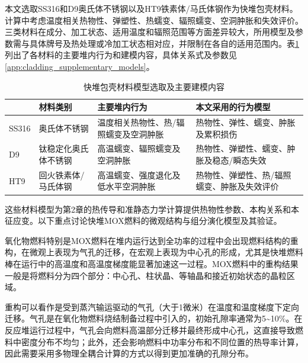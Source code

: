 本文选取SS316和D9奥氏体不锈钢以及HT9铁素体/马氏体钢作为快堆包壳材料。计算中考虑温度相关热物性、弹塑性、热蠕变、辐照蠕变、空洞肿胀和失效评价。三类材料在成分、加工状态、适用温度和辐照范围等方面差异较大，所用模型及参数需与具体牌号及热处理或冷加工状态相对应，并限制在各自的适用范围内。表\ref{tab:ch3_cladding_model_selection}列出了各材料的主要堆内行为和建模内容，具体关系式及参数见\ref{app:cladding_supplementary_models}。

\begin{table}[htbp]
	\centering
	\caption{快堆包壳材料模型选取及主要建模内容}
	\label{tab:ch3_cladding_model_selection}
	\begin{tabularx}{\textwidth}{@{}
			>{\centering\arraybackslash}m{2.0cm}
			>{\centering\arraybackslash}m{3.0cm}
			>{\centering\arraybackslash}X
			>{\centering\arraybackslash}X
			@{}}
		\toprule
		{\centering 材料\par} & {\centering 材料类别\par} & {\centering 主要堆内行为\par} & {\centering 本文采用的行为模型\par} \\
		\midrule
		SS316 & 奥氏体不锈钢 & 温度相关热物性、热/辐照蠕变及空洞肿胀 & 热物性、弹性、蠕变、肿胀及累积损伤 \\
		D9 & 钛稳定化奥氏体不锈钢 & 高温蠕变、辐照蠕变及空洞肿胀 & 热物性、弹塑性、蠕变、肿胀及稳态/瞬态失效 \\
		HT9 & 回火铁素体/马氏体钢 & 高温蠕变、强度退化及低水平空洞肿胀 & 热物性、弹塑性、热/辐照蠕变、肿胀及失效评价 \\
		\bottomrule
	\end{tabularx}
\end{table}

这些材料模型为第2章的热传导和准静态力学计算提供热物性参数、本构关系和本征应变。以下重点讨论快堆MOX燃料的微观结构与组分演化模型及其验证。

\label{sec:pore_migration}

氧化物燃料特别是MOX燃料在堆内运行达到全功率的过程中会出现燃料结构的重构，在微观上表现为气孔的迁移，在宏观上表现为中心孔的形成，尤其是快堆燃料棒在运行中的高温度和高温度梯度能显著加速这一过程。MOX燃料中的重构结果一般是将燃料分为四个部分：中心孔、柱状晶、等轴晶和接近初始状态的晶粒区域。

重构可以看作是受到蒸汽输运驱动的气孔（大于1微米）在温度和温度梯度下定向迁移。气孔是在氧化物燃料烧结制备过程中引入的，初始孔隙率通常为5\~{}10\%。在反应堆运行过程中，气孔会向燃料高温部分迁移并最终形成中心孔，这直接导致燃料中密度分布不均匀；此外，还会影响燃料中功率分布和不同位置的热导率计算，因此需要采用多物理全耦合计算的方式以得到更加准确的孔隙分布。


